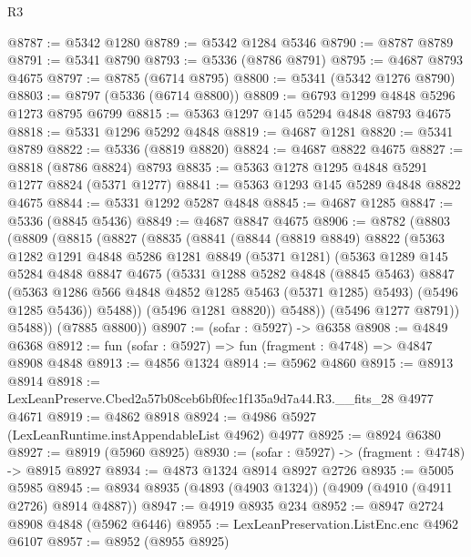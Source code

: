 \begin{lexlean}{R3}
\begin{coremodule}
@8787 := @5342 @1280
@8789 := @5342 @1284 @5346
@8790 := @8787 @8789
@8791 := @5341 @8790
@8793 := @5336 (@8786 @8791)
@8795 := @4687 @8793 @4675
@8797 := @8785 (@6714 @8795)
@8800 := @5341 (@5342 @1276 @8790)
@8803 := @8797 (@5336 (@6714 @8800))
@8809 := @6793 @1299 @4848 @5296 @1273 @8795 @6799
@8815 := @5363 @1297 @145 @5294 @4848 @8793 @4675
@8818 := @5331 @1296 @5292 @4848
@8819 := @4687 @1281
@8820 := @5341 @8789
@8822 := @5336 (@8819 @8820)
@8824 := @4687 @8822 @4675
@8827 := @8818 (@8786 @8824) @8793
@8835 := @5363 @1278 @1295 @4848 @5291 @1277 @8824 (@5371 @1277)
@8841 := @5363 @1293 @145 @5289 @4848 @8822 @4675
@8844 := @5331 @1292 @5287 @4848
@8845 := @4687 @1285
@8847 := @5336 (@8845 @5436)
@8849 := @4687 @8847 @4675
@8906 := @8782
    (@8803
      (@8809
        (@8815
          (@8827
            (@8835
              (@8841
                (@8844
                  (@8819 @8849)
                  @8822
                  (@5363
                    @1282
                    @1291
                    @4848
                    @5286
                    @1281
                    @8849
                    (@5371 @1281)
                    (@5363
                      @1289
                      @145
                      @5284
                      @4848
                      @8847
                      @4675
                      (@5331
                        @1288
                        @5282
                        @4848
                        (@8845 @5463)
                        @8847
                        (@5363 @1286 @566 @4848 @4852 @1285 @5463 (@5371 @1285) @5493)
                        (@5496 @1285 @5436))
                      @5488))
                  (@5496 @1281 @8820))
                @5488))
            (@5496 @1277 @8791))
          @5488))
      (@7885 @8800))
@8907 := (sofar : @5927) -> @6358
@8908 := @4849 @6368
@8912 := fun (sofar : @5927) => fun (fragment : @4748) => @4847 @8908 @4848
@8913 := @4856 @1324
@8914 := @5962 @4860
@8915 := @8913 @8914
@8918 := LexLeanPreserve.Cbed2a57b08ceb6bf0fec1f135a9d7a44.R3.__fits_28 @4977 @4671
@8919 := @4862 @8918
@8924 := @4986 @5927 (LexLeanRuntime.instAppendableList @4962) @4977
@8925 := @8924 @6380
@8927 := @8919 (@5960 @8925)
@8930 := (sofar : @5927) -> (fragment : @4748) -> @8915 @8927
@8934 := @4873 @1324 @8914 @8927 @2726
@8935 := @5005 @5985
@8945 := @8934 @8935 (@4893 (@4903 @1324)) (@4909 (@4910 (@4911 @2726) @8914 @4887))
@8947 := @4919 @8935 @234
@8952 := @8947 @2724 @8908 @4848 (@5962 @6446)
@8955 := LexLeanPreservation.ListEnc.enc @4962 @6107
@8957 := @8952 (@8955 @8925)

\end{coremodule}
\end{lexlean}
